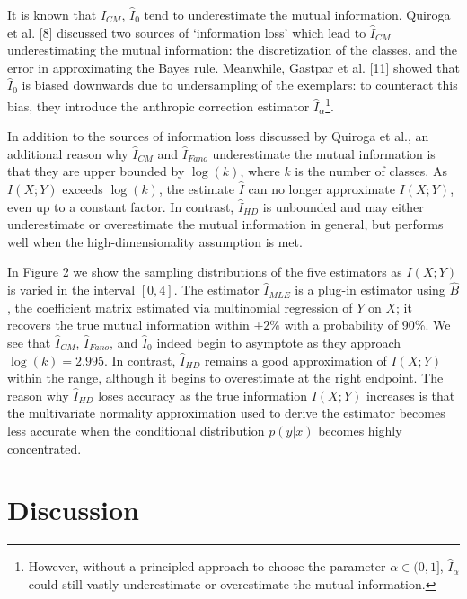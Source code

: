 \documentclass{article}
\begin{document}
It is known that $\hat{I}_{CM}$, $\hat{I}_0$ tend to underestimate the mutual information.
Quiroga et al. [8] discussed two sources of `information loss' which lead to $\hat{I}_{CM}$ underestimating the mutual information:
the discretization of the classes, and the error in approximating the Bayes rule.
Meanwhile, Gastpar et
al. [11] showed that $\hat{I}_0$ is biased downwards due to undersampling
of the exemplars: to counteract this bias, they introduce the
anthropic correction estimator $\hat{I}_\alpha$\footnote{However, without a
principled approach to choose the parameter $\alpha \in (0,1]$,
  $\hat{I}_\alpha$ could still vastly underestimate or overestimate
  the mutual information.}.

In addition to the sources of information loss discussed by Quiroga et al., an additional reason why $\hat{I}_{CM}$ and $\hat{I}_{Fano}$ underestimate the mutual information is that they are upper bounded by $\log(k)$, where $k$ is the number of classes.  As $I(X; Y)$ exceeds $\log(k)$,
the estimate $\hat{I}$ can no longer approximate $I(X; Y)$, even up to
a constant factor.  In contrast, $\hat{I}_{HD}$ is unbounded and 
may either underestimate or overestimate the mutual information in general,
but performs well when the high-dimensionality assumption is met.

In Figure 2 we show the sampling distributions of the five
estimators as $I(X; Y)$ is varied in the interval $[0, 4]$.  The estimator $\hat{I}_{MLE}$
is a plug-in estimator using $\hat{B}$, the coefficient matrix estimated via multinomial regression of $Y$ on $X$;
it recovers the true mutual information within $\pm 2\%$ with a probability of 90\%.
We see that $\hat{I}_{CM}$, $\hat{I}_{Fano}$, and $\hat{I}_0$ indeed begin to
asymptote as they approach $\log(k) = 2.995$.  In contrast,
$\hat{I}_{HD}$ remains a good approximation of $I(X; Y)$ within the
range, although it begins to overestimate at the right endpoint.  
The reason why $\hat{I}_{HD}$ loses accuracy as the true information $I(X; Y)$ increases is that
the multivariate normality approximation used to derive the estimator becomes less accurate when the conditional distribution 
$p(y|x)$ becomes highly concentrated.

\section{Discussion}
\end{document}

